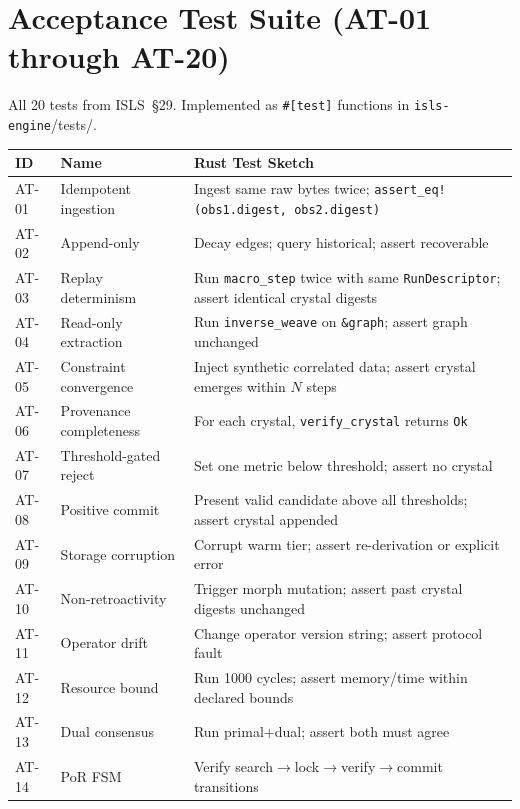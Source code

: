 \documentclass[10pt,a4paper]{article}
\theoremstyle{definition}\newtheorem{definition}{Def}[section]
\theoremstyle{plain}\newtheorem{theorem}{Thm}[section]
\newcommand{\crate}[1]{\texttt{\small\color{rustborder!80!black}#1}}
\newcommand{\ty}[1]{\texttt{\small\color{accent}#1}}
\newcommand{\func}[1]{\texttt{\small\color{success}#1}}
\begin{document}
\section{Acceptance Test Suite (AT-01 through AT-20)}
\label{sec:tests}

All 20 tests from ISLS~\S29. Implemented as \texttt{\#[test]} functions in \crate{isls-engine}/tests/.

\begin{longtable}{l l p{7.5cm}}
\toprule \textbf{ID} & \textbf{Name} & \textbf{Rust Test Sketch} \\
\midrule\endhead
AT-01 & Idempotent ingestion & Ingest same raw bytes twice; \texttt{assert\_eq!(obs1.digest, obs2.digest)} \\
AT-02 & Append-only & Decay edges; query historical; assert recoverable \\
AT-03 & Replay determinism & Run \func{macro\_step} twice with same \ty{RunDescriptor}; assert identical crystal digests \\
AT-04 & Read-only extraction & Run \func{inverse\_weave} on \texttt{\&graph}; assert graph unchanged \\
AT-05 & Constraint convergence & Inject synthetic correlated data; assert crystal emerges within $N$ steps \\
AT-06 & Provenance completeness & For each crystal, \func{verify\_crystal} returns \ty{Ok} \\
AT-07 & Threshold-gated reject & Set one metric below threshold; assert no crystal \\
AT-08 & Positive commit & Present valid candidate above all thresholds; assert crystal appended \\
AT-09 & Storage corruption & Corrupt warm tier; assert re-derivation or explicit error \\
AT-10 & Non-retroactivity & Trigger morph mutation; assert past crystal digests unchanged \\
AT-11 & Operator drift & Change operator version string; assert protocol fault \\
AT-12 & Resource bound & Run 1000 cycles; assert memory/time within declared bounds \\
AT-13 & Dual consensus & Run primal+dual; assert both must agree \\
AT-14 & PoR FSM & Verify search$\to$lock$\to$verify$\to$commit transitions \\

\end{longtable}
\end{document}
